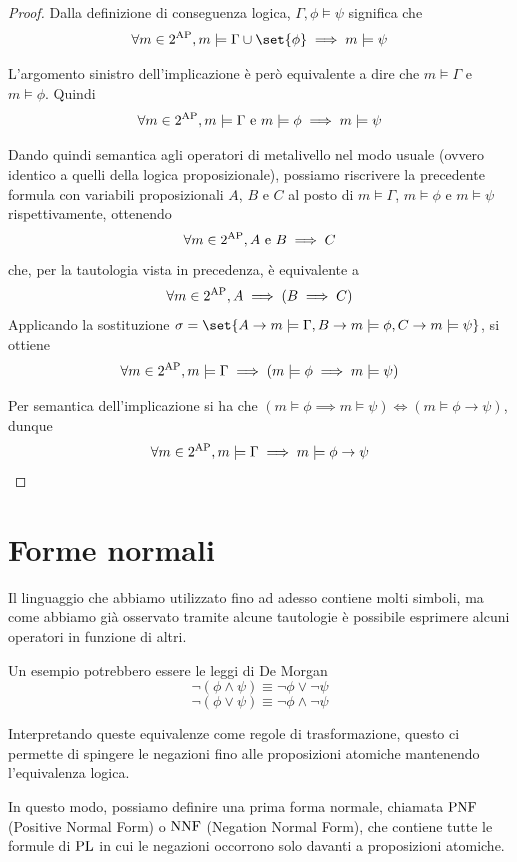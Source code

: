 \begin{proof}
  Dalla definizione di conseguenza logica, \(\Gamma,\phi \models \psi\) significa che
  \[\forall m \in 2^{\AP}, m\models \Gamma \cup \set{\phi} \implies m\models \psi\]

  L'argomento sinistro dell'implicazione è però equivalente a dire che \(m\models \Gamma\) e \(m\models \phi\). Quindi
  \[\forall m \in 2^{\AP}, m\models \Gamma \text{ e } m\models \phi \implies m\models \psi\]

  Dando quindi semantica agli operatori di metalivello nel modo usuale (ovvero identico a quelli della logica proposizionale), possiamo riscrivere la precedente formula con variabili proposizionali \(A\), \(B\) e \(C\) al posto di \(m\models \Gamma\), \(m\models \phi\) e \(m\models \psi\) rispettivamente, ottenendo
  \[\forall m \in 2^{\AP}, A\text{ e }B \implies C\]
  che, per la tautologia vista in precedenza, è equivalente a
  \[\forall m \in 2^{\AP}, A \implies (B \implies C)\]
  Applicando la sostituzione \(\sigma=\set{ A \to m\models \Gamma, B \to m\models \phi, C \to m\models \psi }\), si ottiene 
  \[\forall m \in 2^{\AP}, m\models \Gamma \implies (m\models \phi \implies m\models \psi)\]

  Per semantica dell'implicazione si ha che \((m\models \phi \implies m\models \psi) \iff (m\models \phi \to \psi)\), dunque
  \[\forall m \in 2^{\AP}, m\models \Gamma \implies m\models \phi\to\psi\]
\end{proof}

\section{Forme normali}

Il linguaggio che abbiamo utilizzato fino ad adesso contiene molti simboli, ma come abbiamo già osservato tramite alcune tautologie è possibile esprimere alcuni operatori in funzione di altri.

Un esempio potrebbero essere le leggi di De Morgan
\[\neg(\phi\land\psi) \equiv \neg\phi \lor \neg\psi\]
\[\neg(\phi\lor\psi) \equiv \neg\phi \land \neg\psi\]

Interpretando queste equivalenze come regole di trasformazione, questo ci permette di spingere le negazioni fino alle proposizioni atomiche mantenendo l'equivalenza logica.

In questo modo, possiamo definire una prima forma normale, chiamata \(\operatorname{PNF}\) (Positive Normal Form) o \(\operatorname{NNF}\) (Negation Normal Form), che contiene tutte le formule di \(\operatorname{PL}\) in cui le negazioni occorrono solo davanti a proposizioni atomiche.

